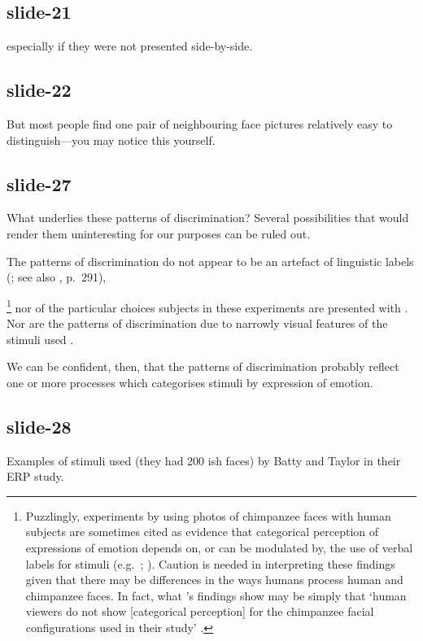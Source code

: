 \documentclass[12pt,\papersize]{extarticle}
\begin{document}
\subsection{slide-21}
especially if they were not presented side-by-side.

\subsection{slide-22}
But most people find one pair of neighbouring face pictures  relatively easy to distinguish---you may notice this yourself.

\subsection{slide-27}
What underlies these patterns of discrimination?
Several possibilities that would render them uninteresting for our purposes can be ruled out.

The patterns of discrimination do not appear to be an artefact of linguistic labels
(\citealp{sauter:2011_categorical}; see also \citealp{laukka:2005_categorical}, p.\ 291),%

%
\footnote{
Puzzlingly, experiments by \citet{fugate:2010_reading} using photos of chimpanzee faces with human subjects are sometimes cited as evidence that categorical perception of expressions of emotion depends on, or can be modulated by, the use of verbal labels for stimuli (e.g.\ \citealp[p.\ 288]{barrett:2011_context}; \citealp[p.\ 315]{gendron:2012_emotion}).
Caution is needed in interpreting these findings
given that there may be differences in the ways  humans process human and chimpanzee faces.
In fact, what \citeauthor{fugate:2010_reading}'s findings show may be simply that `human viewers do not show [categorical perception] for the chimpanzee facial configurations used in their study' \citep[p.\ 1482]{sauter:2011_categorical}.
}
%
nor of the particular choices subjects in these experiments are presented with \citep{bimler:2001_categorical,fujimura:2011_categorical}.
Nor are the patterns of discrimination due to narrowly visual features of the stimuli used \citep{sato:2009_detection}.

We can be confident, then, that the patterns of discrimination probably reflect one or more processes which categorises stimuli by expression of emotion.

\subsection{slide-28}
Examples of stimuli used (they had 200 ish faces) by Batty and Taylor in their ERP study.
\end{document}
